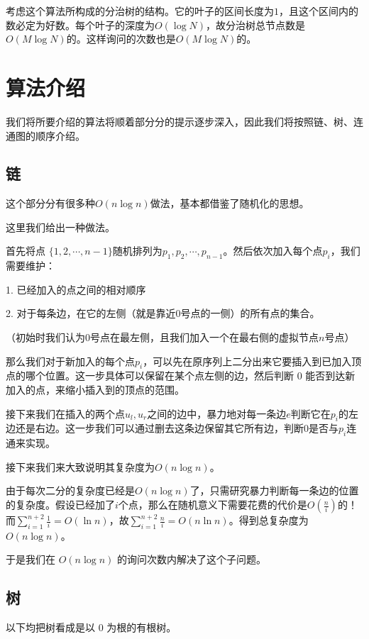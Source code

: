 \documentclass{noithesis}
\begin{document}
考虑这个算法所构成的分治树的结构。它的叶子的区间长度为$1$，且这个区间内的数必定为好数。每个叶子的深度为$O(\log N)$，故分治树总节点数是$O(M \log N)$的。这样询问的次数也是$O(M \log N)$的。

\section{算法介绍}

我们将所要介绍的算法将顺着部分分的提示逐步深入，因此我们将按照链、树、连通图的顺序介绍。

\subsection{链}

这个部分分有很多种$O(n \log n)$做法，基本都借鉴了随机化的思想。

这里我们给出一种做法。

首先将点 $\{ 1, 2, \cdots, n - 1\}$随机排列为$p_1, p_2, \cdots, p_{n - 1}$。然后依次加入每个点$p_i$，我们需要维护：

1. 已经加入的点之间的相对顺序

2. 对于每条边，在它的左侧（就是靠近$0$号点的一侧）的所有点的集合。

（初始时我们认为$0$号点在最左侧，且我们加入一个在最右侧的虚拟节点$n$号点）

那么我们对于新加入的每个点$p_i$，可以先在原序列上二分出来它要插入到已加入顶点的哪个位置。这一步具体可以保留在某个点左侧的边，然后判断 0 能否到达新加入的点，来缩小插入到的顶点的范围。

接下来我们在插入的两个点$u_l, u_r$之间的边中，暴力地对每一条边$e$判断它在$p_i$的左边还是右边。这一步我们可以通过删去这条边保留其它所有边，判断$0$是否与$p_i$连通来实现。

接下来我们来大致说明其复杂度为$O(n \log n)$。

由于每次二分的复杂度已经是$O(n \log n)$了，只需研究暴力判断每一条边的位置的复杂度。假设已经加了$i$个点，那么在随机意义下需要花费的代价是$O(\frac{n}{i})$的！而$\sum_{i = 1}^{n + 2} \frac{1}{i} = O(\ln n)$，故$\sum_{i = 1}^{n + 2} \frac{n}{i} = O(n \ln n)$。得到总复杂度为$O(n \log n)$。

于是我们在 $O(n \log n)$ 的询问次数内解决了这个子问题。


\subsection{树}

以下均把树看成是以 0 为根的有根树。
\end{document}
